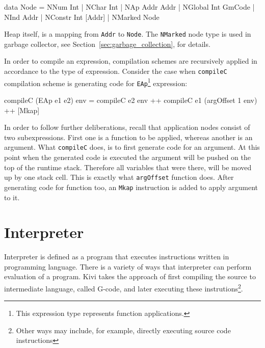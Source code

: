 \documentclass[12pt,a4paper]{report}
\begin{document}
\vspace*{0.2in}
\begin{code}[style=haskell]
  data Node = NNum Int
            | NChar Int
            | NAp Addr Addr
            | NGlobal Int GmCode
            | NInd Addr
            | NConstr Int [Addr]
            | NMarked Node
\end{code}

Heap itself, is a mapping from \texttt{Addr} to \texttt{Node}. The
\texttt{NMarked} node type is used in garbage collector, see
Section~\ref{sec:garbage_collection}, for details.

In order to compile an expression, compilation schemes are recursively applied
in accordance to the type of expression. Consider the case when
\texttt{compileC} compilation scheme is generating code for
\texttt{EAp}\footnote{This expression type represents function applications.}
expression:

\vspace*{0.2in}
\begin{code}[style=haskell]
  compileC (EAp e1 e2) env =
      compileC e2 env ++
      compileC e1 (argOffset 1 env) ++
      [Mkap]
\end{code}

In order to follow further deliberations, recall that application nodes consist
of two subexpressions. First one is a function to be applied, whereas another
is an argument. What \texttt{compileC} does, is to first generate code for an
argument. At this point when the generated code is executed the argument will
be pushed on the top of the runtime stack. Therefore all variables that were
there, will be moved up by one stack cell. This is exactly what
\texttt{argOffset} function does. After generating code for function too, an
\texttt{Mkap} instruction is added to apply argument to it.

%
%

\section{Interpreter}
\label{sec:interpreter}
Interpreter is defined as a program that executes instructions written in
programming language. There is a variety of ways that interpreter can perform
evaluation of a program. Kivi takes the approach of first compiling the source
to intermediate language, called G-code, and later executing these
instrutions\footnote{Other ways may include, for example, directly executing
source code instructions}.
\end{document}
